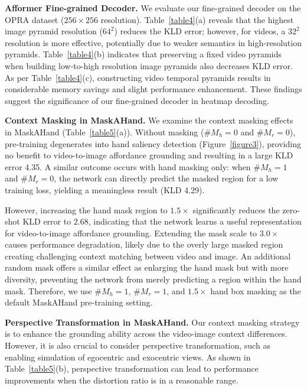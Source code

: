 \documentclass[10pt,twocolumn,letterpaper]{article}
\begin{document}
\noindent\textbf{Afformer Fine-grained Decoder.} 
We evaluate our fine-grained decoder on the OPRA dataset ($256\times256$ resolution). Table~\ref{table4}(a) reveals that the highest image pyramid resolution ($64^2$) reduces the KLD error; however, for videos, a $32^2$ resolution is more effective, potentially due to weaker semantics in high-resolution pyramids. Table~\ref{table4}(b) indicates that preserving a fixed video pyramids when building low-to-high resolution image pyramids also decreases KLD error. As per Table~\ref{table4}(c), constructing video temporal pyramids results in considerable memory savings and slight performance enhancement. These findings suggest the significance of our fine-grained decoder in heatmap decoding.

\noindent\textbf{Context Masking in MaskAHand.} 
We examine the context masking effects in MaskAHand (Table~\ref{table5}(a)). Without masking ($\#M_h=0$ and $\#M_r=0$), pre-training degenerates into hand saliency detection (Figure~\ref{figure3}), providing no benefit to video-to-image affordance grounding and resulting in a large KLD error 4.35. A similar outcome occurs with hand masking only: when $\#M_h=1$ and $\#M_r=0$, the network can directly predict the masked region for a low training loss, yielding a meaningless result (KLD 4.29).

However, increasing the hand mask region to $1.5\times$ significantly reduces the zero-shot KLD error to $2.68$, indicating that the network learns a useful representation for video-to-image affordance grounding. Extending the mask scale to $3.0\times$ causes performance degradation, likely due to the overly large masked region creating challenging context matching between video and image. An additional random mask offers a similar effect as enlarging the hand mask but with more diversity, preventing the network from merely predicting a region within the hand mask. Therefore, we use $\#M_h=1$, $\#M_r=1$, and $1.5\times$ hand box masking as the default MaskAHand pre-training setting.
 
\noindent\textbf{Perspective Transformation in MaskAHand.} 
Our context masking strategy is to enhance the grounding ability across the video-image context differences. However, it is also crucial to consider perspective transformation, such as enabling simulation of egocentric and exocentric views. As shown in Table~\ref{table5}(b), perspective transformation can lead to performance improvements when the distortion ratio is in a reasonable range.
\end{document}

